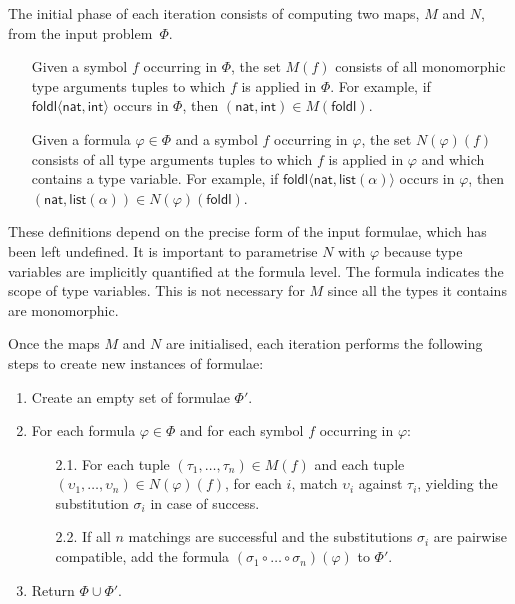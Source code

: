 \documentclass[]{ceurart}
\newcommand\ty[1]{\textsf{#1}}
\newcommand\sym[1]{\textsf{#1}}
\begin{document}
The initial phase of each iteration consists of computing two maps, \(M\) and \(N\), from the input problem~$\Phi$.
%
\begin{enumerate}
\item[\labelitemi] Given a symbol \(f\) occurring in \(\Phi\), the set \(M(f)\) consists of all monomorphic type arguments tuples to which \(f\) is applied in \(\Phi\). For example, if \(\sym{foldl}\langle \ty{nat}, \ty{int}\rangle\) occurs in \(\Phi\), then \((\ty{nat}, \ty{int}) \in M(\sym{foldl}) \).

\item[\labelitemi] Given a formula \(\varphi \in \Phi\) and a symbol \(f\) occurring in \(\varphi\), the set \(N(\varphi)(f)\) consists of all type arguments tuples to which \(f\) is applied in \(\varphi\) and which contains a type variable. For example, if \(\sym{foldl}\langle \ty{nat}, \ty{list}(\alpha)\rangle\) occurs in \(\varphi\), then \((\ty{nat}, \ty{list}(\alpha)) \in N(\varphi)(\sym{foldl}) \).
\end{enumerate}

These definitions depend on the precise form of the input formulae, which has been left undefined. It is important to parametrise \(N\) with \(\varphi\) because type variables are implicitly quantified at the formula level. The formula indicates the scope of type variables. This is not necessary for \(M\) since all the types it contains are monomorphic.

Once the maps \(M\) and \(N\) are initialised, each iteration performs the following steps to create new instances of formulae:

\begin{enumerate}

   \item Create an empty set of formulae \(\Phi'\).

   \item For each formula \(\varphi \in \Phi\) and for each symbol \(f\) occurring in \(\varphi\):
   \begin{enumerate}
    \item[2.1.] For each tuple \((\tau_1, \dots, \tau_n) \in  M(f)\) and each tuple \((\upsilon_1, \dots, \upsilon_n) \in N(\varphi)(f)\),
     for each \(i\), match \(\upsilon_i\) against \(\tau_i\), yielding the substitution \(\sigma_i\) in case of success.

    \item[2.2.] If all \(n\) matchings are successful and the substitutions \(\sigma_i\) are pairwise compatible,
add the formula \((\sigma_1 \circ \dots \circ \sigma_n)(\varphi)\) to \(\Phi'\).
   \end{enumerate}

   \item Return \(\Phi \cup \Phi'\).

\end{enumerate}
\end{document}

